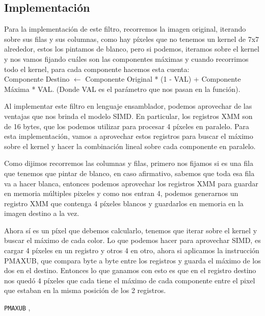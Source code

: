 \subsection{Implementación}

Para la implementación de este filtro, recorremos la imagen original, iterando sobre sus filas y sus columnas, como hay píxeles que no tenemos un kernel de 7x7 alrededor, estos los pintamos de blanco, pero si podemos, iteramos sobre el kernel y nos vamos fijando cuáles son las componentes máximas y cuando recorrimos todo el kernel, para cada componente hacemos esta cuenta: \\ Componente Destino $\leftarrow$ Componente Original * (1 - VAL) + Componente Máxima * VAL. (Donde VAL es el parámetro que nos pasan en la función).

Al implementar este filtro en lenguaje ensamblador, podemos aprovechar de las ventajas que nos brinda el modelo SIMD. En particular, los registros XMM son de 16 bytes, que los podemos utilizar para procesar 4 píxeles en paralelo. Para esta implementación, vamos a aprovechar estos registros para buscar el máximo sobre el kernel y hacer la combinación lineal sobre cada componente en paralelo.

Como dijimos recorremos las columnas y filas, primero nos fijamos si es una fila que tenemos que pintar de blanco, en caso afirmativo, sabemos que toda esa fila va a hacer blanca, entonces podemos aprovechar los registros XMM para guardar en memoria múltiples pixeles y como nos entran 4, podemos generarnos un registro XMM que contenga 4 píxeles blancos y guardarlos en memoria en la imagen destino a la vez. 

Ahora sí es un píxel que debemos calcularlo, tenemos que iterar sobre el kernel y buscar el máximo de cada color. Lo que podemos hacer para aprovechar SIMD, es cargar 4 píxeles en un registro y otros 4 en otro, ahora si aplicamos la instrucción PMAXUB, que compara byte a byte entre los registros y guarda el máximo de los dos en el destino. Entonces lo que ganamos con esto es que en el registro destino nos quedó 4 píxeles que cada tiene el máximo de cada componente entre el pixel que estaban en la misma posición de los 2 registros. 

\begin{center}
 

 

\texttt{PMAXUB} ,  \hfill

 
\end{center}

